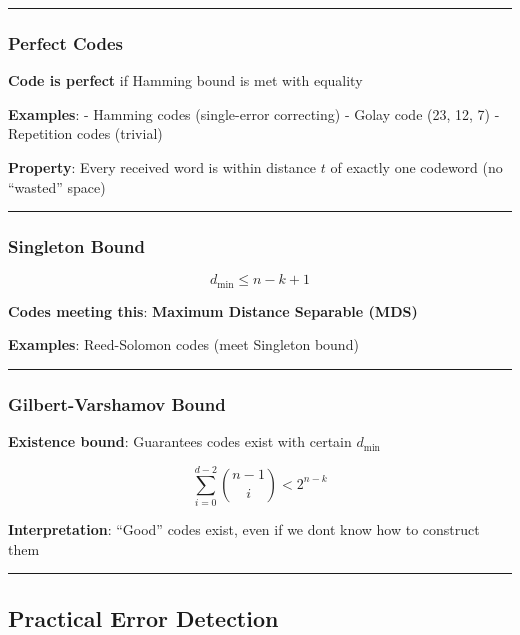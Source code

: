 \begin{center}\rule{0.5\linewidth}{0.5pt}\end{center}

\subsubsection{Perfect Codes}\label{perfect-codes}

\textbf{Code is perfect} if Hamming bound is met with equality

\textbf{Examples}: - Hamming codes (single-error correcting) - Golay
code (23, 12, 7) - Repetition codes (trivial)

\textbf{Property}: Every received word is within distance \(t\) of
exactly one codeword (no ``wasted'' space)

\begin{center}\rule{0.5\linewidth}{0.5pt}\end{center}

\subsubsection{Singleton Bound}\label{singleton-bound}

\[
d_{\min} \leq n - k + 1
\]

\textbf{Codes meeting this}: \textbf{Maximum Distance Separable (MDS)}

\textbf{Examples}: Reed-Solomon codes (meet Singleton bound)

\begin{center}\rule{0.5\linewidth}{0.5pt}\end{center}

\subsubsection{Gilbert-Varshamov Bound}\label{gilbert-varshamov-bound}

\textbf{Existence bound}: Guarantees codes exist with certain
\(d_{\min}\)

\[
\sum_{i=0}^{d-2} \binom{n-1}{i} < 2^{n-k}
\]

\textbf{Interpretation}: ``Good'' codes exist, even if we
don\textquotesingle t know how to construct them

\begin{center}\rule{0.5\linewidth}{0.5pt}\end{center}

\subsection{Practical Error Detection}\label{practical-error-detection}

